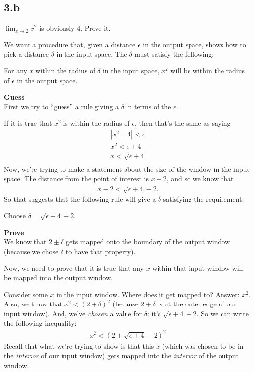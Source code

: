 \newpage
\subsection*{3.b}
$\lim_{x\to 2} x^2$ is obviously 4. Prove it.\\

\begin{mdframed}
  We want a procedure that, given a distance $\epsilon$ in the output space,
  shows how to pick a distance $\delta$ in the input space. The $\delta$ must satisfy the following:

  For any $x$ within the radius of $\delta$ in the input space, $x^2$ will be
  within the radius of $\epsilon$ in the output space.

  \textbf{Guess}\\
  First we try to ``guess'' a rule giving a $\delta$ in terms of the $\epsilon$.

  If it is true that $x^2$ is within the radius of $\epsilon$, then that's the
  same as saying
  \begin{align*}
    |x^2 - 4| < \epsilon\\
    x^2 < \epsilon + 4\\
    x < \sqrt{\epsilon + 4}\\
  \end{align*}
  Now, we're trying to make a statement about the size of the window in the
  input space. The distance from the point of interest is $x - 2$, and so we
  know that
  \begin{align*}
    x - 2 < \sqrt{\epsilon + 4} - 2.
  \end{align*}
  So that suggests that the following rule will give a $\delta$ satisfying the
  requirement:

  Choose $\delta = \sqrt{\epsilon + 4} - 2$.

  \textbf{Prove}\\
  We know that $2 \pm \delta$ gets mapped onto the boundary of the output
  window (because we chose $\delta$ to have that property).

  Now, we need to prove that it is true that any $x$ within that input window
  will be mapped into the output window.

  Consider some $x$ in the input window. Where does it get mapped to? Answer:
  $x^2$. Also, we know that $x^2 < (2 + \delta)^2$ (because $2+\delta$ is at
  the outer edge of our input window). And, we've \textit{chosen} a value for
  $\delta$: it's $\sqrt{\epsilon + 4} - 2$. So we can write the following
  inequality:
  \begin{align*}
    x^2 < (2 + \sqrt{\epsilon + 4} - 2)^2
  \end{align*}
  Recall that what we're trying to show is that this $x$ (which was chosen to
  be in the \textit{interior} of our input window) gets mapped into the
  \textit{interior} of the output window.


\end{mdframed}
